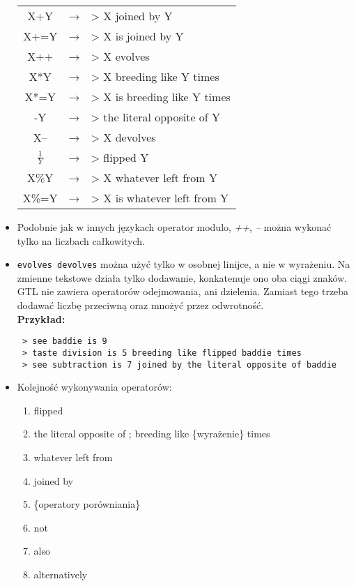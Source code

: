 \documentclass{article}
\begin{document}
\begin{itemize}
\begin{table}[H]
\centering
\begin{tabular}{ccl}
X+Y             & → & > X joined by Y                               \\
X+=Y            & → & > X is joined by Y                            \\
X++             & → & > X evolves                               \\
X*Y             & → & > X breeding like Y times                     \\
X*=Y            & → & > X is breeding like Y times                  \\
-Y              & → & > the literal opposite of Y                   \\
X--             & → & > X devolves                               \\
$\frac{1}{Y}$   & → & > flipped Y                                   \\
X\%Y            & → & > X whatever left from Y                      \\
X\%=Y           & → & > X is whatever left from Y
\end{tabular}
\end{table}

\item Podobnie jak w innych językach operator modulo, \textit{++}, \textit{--} można wykonać tylko na liczbach całkowitych.
\item \texttt{evolves devolves} można użyć tylko w osobnej linijce, a nie w wyrażeniu.
Na zmienne tekstowe działa tylko dodawanie, konkatenuje ono oba ciągi znaków.
GTL nie zawiera operatorów odejmowania, ani dzielenia. Zamiast tego trzeba dodawać liczbę przeciwną oraz mnożyć przez odwrotność.\\

\textbf{Przykład:}
{\color{green}
\begin{verbatim}
 > see baddie is 9
 > taste division is 5 breeding like flipped baddie times
 > see subtraction is 7 joined by the literal opposite of baddie
\end{verbatim}
}

\newpage

\item Kolejność wykonywania operatorów:
\begin{enumerate}
    \item flipped
    \item the literal opposite of ; breeding like \{wyrażenie\} times
    \item whatever left from
    \item joined by
    \item \{operatory porówniania\}
    \item not
    \item also
    \item alternatively


\end{enumerate}
\end{itemize}
\end{document}
